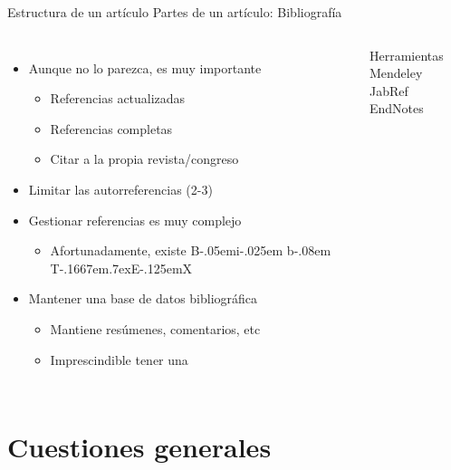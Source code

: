 \documentclass{beamer}
\begin{document}
\begin{frame}{Estructura de un artículo} {Partes de un artículo: Bibliografía}
	\begin{columns}
	\begin{itemize}
		\item Aunque no lo parezca, es muy importante
		\begin{itemize}
			\item Referencias actualizadas
			\item Referencias completas
			\item Citar a la propia revista/congreso
		\end{itemize}
		\item Limitar las autorreferencias (2-3)
		\item Gestionar referencias es muy complejo
			\begin{itemize}
			\item Afortunadamente, existe {\rm B\kern-.05em{\sc i\kern-.025em b}\kern-.08em
			    T\kern-.1667em\lower.7ex\hbox{E}\kern-.125emX}
			\end{itemize}
		\item \alert{Mantener una base de datos bibliográfica}
			\begin{itemize}
			\item Mantiene resúmenes, comentarios, etc
			\item Imprescindible tener una
			\end{itemize}
	\end{itemize}
		\begin{block}{Herramientas}
		Mendeley\\
		JabRef\\
		EndNotes
		\end{block}
	\end{columns}
\end{frame}

\section{Cuestiones generales}
\end{document}
